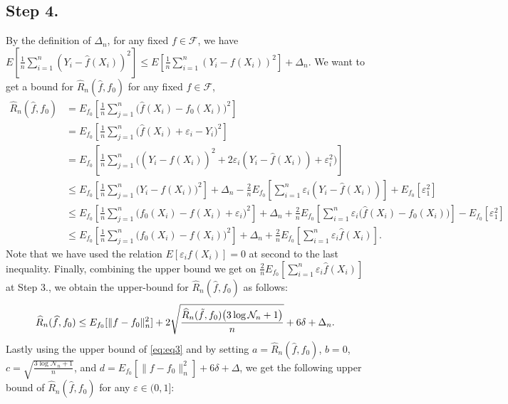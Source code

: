 \documentclass{article}
\theoremstyle{definition}
\begin{document}
\subsection{Step 4.}
By the definition of $\Delta_{n}$, for any fixed $f\in\mathcal{F}$, we have $E[\frac{1}{n}\sum_{i=1}^{n}(Y_{i}-\widehat{f}(X_{i}))^{2}]\leq E[\frac{1}{n}\sum_{i=1}^{n}(Y_{i}-f(X_{i}))^{2}]+\Delta_{n}$. We want to get a bound for $\widehat{R}_{n}(\widehat{f},f_{0})$ for any fixed $f\in \mathcal{F}$,
\begin{align*}
    \widehat{R}_{n}(\widehat{f},f_{0}) 
    &= E_{f_{0}}\left[ \frac{1}{n} \sum_{j=1}^{n} \big( \widehat{f}(X_{i}) - f_{0}(X_{i}) \big)^{2} \right] \\ 
    &= E_{f_{0}}\left[ \frac{1}{n} \sum_{j=1}^{n} \big( \widehat{f}(X_{i}) +\varepsilon_{i} - Y_{i} \big)^{2} \right] \\
    &= E_{f_{0}}\left[ \frac{1}{n} \sum_{j=1}^{n} \bigg( (Y_{i} - \widehat{f}(X_{i}) )^{2} + 2\varepsilon_{i} ( Y_{i} - \widehat{f}(X_{i})) + \varepsilon_{i}^{2} \bigg) \right] \\
    &\leq E_{f_{0}}\left[ \frac{1}{n} \sum_{j=1}^{n} \big( Y_{i} - f(X_{i}) \big)^{2} \right] + \Delta_{n} - \frac{2}{n} E_{f_{0}}\left[\sum_{i=1}^{n}\varepsilon_{i} ( Y_{i} - \widehat{f}(X_{i}))\right] + E_{f_{0}}[\varepsilon_{1}^{2}] \\
    &\leq E_{f_{0}}\left[ \frac{1}{n} \sum_{j=1}^{n} \bigg( f_{0}(X_{i}) - f(X_{i}) + \varepsilon_{i} \bigg)^{2} \right] + \Delta_{n} + \frac{2}{n} E_{f_{0}}\left[\sum_{i=1}^{n}\varepsilon_{i} \bigg( \widehat{f}(X_{i})-f_{0}(X_{i}) \bigg)\right] - E_{f_{0}}[\varepsilon_{1}^{2}] \\
    &\leq E_{f_{0}}\left[ \frac{1}{n} \sum_{j=1}^{n} \bigg( f_{0}(X_{i}) - f(X_{i}) \bigg)^{2} \right] + \Delta_{n} + \frac{2}{n} E_{f_{0}}\left[\sum_{i=1}^{n}\varepsilon_{i} \widehat{f}(X_{i})\right].
\end{align*}
Note that we have used the relation $E[\varepsilon_{i} f(X_{i})]=0$ at second to the last inequality. Finally, combining the upper bound we get on $\frac{2}{n} E_{f_{0}}\left[\sum_{i=1}^{n}\varepsilon_{i} \widehat{f}(X_{i})\right]$ at Step 3., we obtain the upper-bound for $\widehat{R}_{n}(\widehat{f},f_{0})$ as follows:
\begin{eqnarray*}
    \widehat{R}_{n}(\widehat{f},f_{0}) \leq E_{f_{0}}[\|f-f_{0}\|_{n}^{2}] + 2\sqrt{\frac{\widehat{R}_{n}(\Tilde{f},f_{0})\big( 3\log\mathcal{N}_{n}+1 \big)}{n}}+6\delta + \Delta_{n}.
\end{eqnarray*}
Lastly using the upper bound of \eqref{eq:eq3} and by setting $a=\widehat{R}_{n}(\widehat{f},f_{0})$, $b=0$, $c=\sqrt{\frac{3\log\mathcal{N}_{n}+1}{n}}$, and $d=E_{f_{0}}[\|f-f_{0}\|_{n}^{2}]+6\delta+\Delta$, we get the following upper bound of $\widehat{R}_{n}(\widehat{f},f_{0})$ for any $\varepsilon \in (0,1]$:
\end{document}
